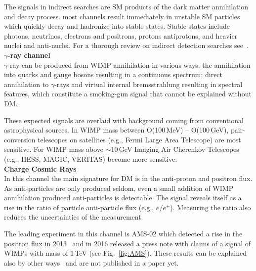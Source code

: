 The signals in indirect searches are SM products of the dark matter annihilation and decay process. most channels result immediately in unstable SM particles which quickly decay and hadronize into stable states. Stable states include photons, neutrinos, electrons and positrons, protons antiprotons, and heavier nuclei and anti-nuclei. For a thorough review on indirect detection searches see~\cite{Conrad:2014tla}.\\

	\textbf{$\gamma$-ray channel}\\

$\gamma$-ray can be produced from WIMP annihilation in various ways: the annihilation into quarks and gauge bosons resulting in a continuous spectrum; direct annihilation to $\gamma$-rays and virtual internal bremsstrahlung resulting in spectral features, which constitute a smoking-gun signal that cannot be explained without DM.

These expected signals are overlaid with background coming from conventional astrophysical sources. In WIMP mass between O(100\,MeV) -- O(100\,GeV), pair-conversion telescopes on satellites (e.g., Fermi Large Area Telescope) are most sensitive. For WIMP mass above $\sim 10$\,GeV Imaging Air Cherenkov Telescopes (e.g., HESS, MAGIC, VERITAS) become more sensitive.\\

\textbf{Charge Cosmic Rays}\\

In this channel the main signature for DM is in the anti-proton and positron flux. As anti-particles are  only produced seldom, even a small addition of WIMP annihilation produced anti-particles is detectable. The signal reveals itself as a rise in the ratio of particle anti-particle flux (e.g., $e/e^+$). Measuring the ratio also reduces the uncertainties of the measurement.  

The leading experiment in this channel is AMS-02 which detected a rise in the positron flux in 2013~\cite{Aguilar:2013qda} and in 2016 released a press note with claims of a signal of WIMPs with mass of 1\,TeV (see Fig.~\ref{fig:AMS}). These results can be explained also by other ways~\cite{Blum:2013zsa} and are not published in a paper yet. \\

